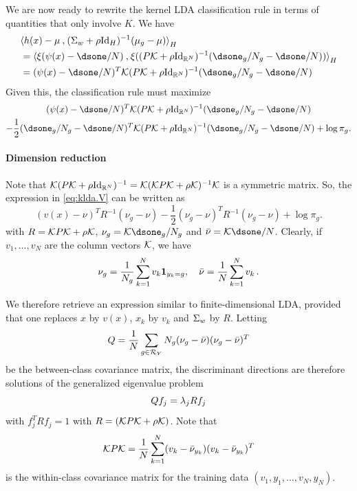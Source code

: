 We are now ready to rewrite the kernel LDA classification rule in terms of quantities that only involve $K$. We have  
\[
\begin{aligned}
&\scp{h(x)-\mu}{ (\Sig_w + \rho\Id_H)^{-1} (\mu_g - \mu)}_H \\
 & = \scp{\xi(\psi(x) - \dsone/N)}{\xi((P\CK + \rho\Id[N])^{-1} (\dsone_g/N_g - \dsone/N))}_H\\
&= (\psi(x) - \dsone/N)^T\CK(P\CK + \rho\Id[N])^{-1} (\dsone_g/N_g - \dsone/N)
\end{aligned}
\]
 Given this, the classification rule must maximize
\begin{multline}
(\psi(x) - \dsone/N)^T\CK (P\CK + \rho\Id[N])^{-1} (\dsone_g/N_g - \dsone/N)\\
 - \frac12 (\dsone_g/N_g - \dsone/N)^T \CK (P\CK + \rho\Id[N])^{-1} (\dsone_g/N_g - \dsone/N) + \log\pi_g.
\label{eq:klda.V}
\end{multline}

\paragraph{Dimension reduction}
Note that $\CK (P\CK + \rho\Id[N])^{-1} = \CK (\CK P\CK + \rho\CK)^{-1} \CK$ is a symmetric matrix. So, the expression in \cref{eq:klda.V} can be written as
\[
(v(x) - \nu )^T R^{-1} (\nu_g - \nu)
 - \frac12 (\nu_g - \nu)^T R^{-1} (\nu_g - \nu) + \log\pi_g.
\]
with $R = {\mathcal K} P{\mathcal K} + \rho{\mathcal K}$, $\nu_g = \CK \dsone_g/N_g$ and $\bar\nu = \CK \dsone /N$. Clearly, if $v_1, \ldots, v_N$ are the column vectors ${\mathcal K}$, we have
\[
\nu_g = \frac1{N_g} \sum_{k=1}^N v_k {\bm 1}_{y_k=g},
\quad
\bar\nu = \frac1N \sum_{k=1}^N v_k\,.
\]


We therefore retrieve an expression similar to  finite-dimensional LDA, provided that one replaces $x$ by $v(x)$, $x_k$ by $v_k$ and $\Sigma_w$ by  $R$. Letting 
\[
Q= \frac1N \sum_{g\in {\mathcal R}_Y} N_g (\nu_g-\bar\nu)(\nu_g-\bar\nu)^T
\]
be the between-class covariance matrix, 
the discriminant directions are therefore  solutions of the generalized eigenvalue problem
\[
Q f_j = \lambda_j R f_j
\]
with $f_j^TRf_j = 1$ with $R=({\mathcal K} P{\mathcal K} + \rho {\mathcal K})$. Note that 
\[
{\mathcal K} P {\mathcal K} = \frac1N \sum_{k=1}^N (v_k - \bar\nu_{y_k})(v_k - \bar\nu_{y_k})^T
\]
is the within-class covariance matrix for the training data $(v_1, y_1, \ldots, v_N, y_N)$.

